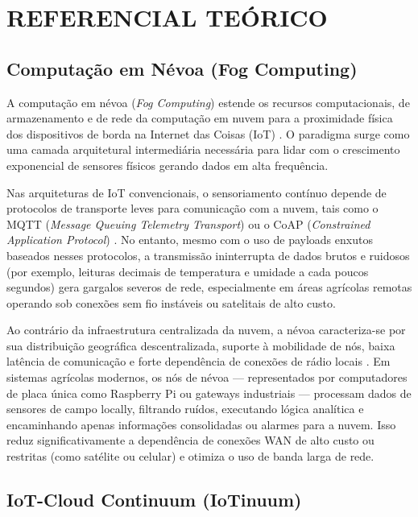 \documentclass[
	12pt,
	openright,
	oneside,
	a4paper,
	english,
	brazil
	]{abntex2}
\begin{document}
\chapter{REFERENCIAL TEÓRICO}
\label{cap:referencial}

\section{Computação em Névoa (Fog Computing)}

A computação em névoa (\textit{Fog Computing}) estende os recursos computacionais, de armazenamento e de rede da computação em nuvem para a proximidade física dos dispositivos de borda na Internet das Coisas (IoT) \cite{bonomi2012fog}. O paradigma surge como uma camada arquitetural intermediária necessária para lidar com o crescimento exponencial de sensores físicos gerando dados em alta frequência. 

Nas arquiteturas de IoT convencionais, o sensoriamento contínuo depende de protocolos de transporte leves para comunicação com a nuvem, tais como o MQTT (\textit{Message Queuing Telemetry Transport}) ou o CoAP (\textit{Constrained Application Protocol}) \cite{alfuqaha2015iot}. No entanto, mesmo com o uso de payloads enxutos baseados nesses protocolos, a transmissão ininterrupta de dados brutos e ruidosos (por exemplo, leituras decimais de temperatura e umidade a cada poucos segundos) gera gargalos severos de rede, especialmente em áreas agrícolas remotas operando sob conexões sem fio instáveis ou satelitais de alto custo.

Ao contrário da infraestrutura centralizada da nuvem, a névoa caracteriza-se por sua distribuição geográfica descentralizada, suporte à mobilidade de nós, baixa latência de comunicação e forte dependência de conexões de rádio locais \cite{buyya2018fog}. Em sistemas agrícolas modernos, os nós de névoa — representados por computadores de placa única como Raspberry Pi ou gateways industriais — processam dados de sensores de campo locally, filtrando ruídos, executando lógica analítica e encaminhando apenas informações consolidadas ou alarmes para a nuvem. Isso reduz significativamente a dependência de conexões WAN de alto custo ou restritas (como satélite ou celular) e otimiza o uso de banda larga de rede.

\section{IoT-Cloud Continuum (IoTinuum)}
\end{document}
